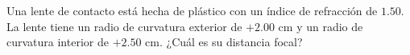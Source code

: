 \item Una lente de contacto está hecha de plástico con un índice de refracción de $1.50$. La lente tiene un radio de curvatura exterior de $+2.00\text{ cm}$ y un radio de curvatura interior de $+2.50\text{ cm}$. ¿Cuál es su distancia focal?